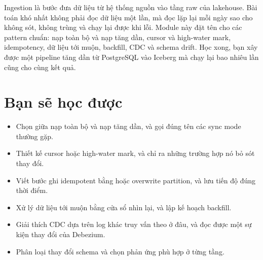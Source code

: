 
Ingestion là bước đưa dữ liệu từ hệ thống nguồn vào tầng raw của lakehouse. Bài toán khó nhất không phải đọc dữ liệu một lần, mà đọc lặp lại mỗi ngày sao cho không sót, không trùng và chạy lại được khi lỗi. Module này đặt tên cho các pattern chuẩn: nạp toàn bộ và nạp tăng dần, cursor và high-water mark, idempotency, dữ liệu tới muộn, backfill, CDC và schema drift. Học xong, bạn xây được một pipeline tăng dần từ PostgreSQL vào Iceberg mà chạy lại bao nhiêu lần cũng cho cùng kết quả.

\section{Bạn sẽ học được}
\begin{itemize}
  \item Chọn giữa nạp toàn bộ và nạp tăng dần, và gọi đúng tên các sync mode thường gặp.
  \item Thiết kế cursor hoặc high-water mark, và chỉ ra những trường hợp nó bỏ sót thay đổi.
  \item Viết bước ghi idempotent bằng  hoặc overwrite partition, và lưu tiến độ đúng thời điểm.
  \item Xử lý dữ liệu tới muộn bằng cửa sổ nhìn lại, và lập kế hoạch backfill.
  \item Giải thích CDC dựa trên log khác truy vấn theo  ở đâu, và đọc được một sự kiện thay đổi của Debezium.
  \item Phân loại thay đổi schema và chọn phản ứng phù hợp ở từng tầng.
\end{itemize}

